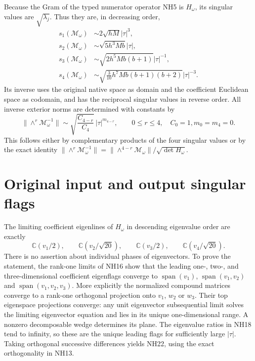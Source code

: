 \documentclass[11pt]{article}
\newcommand{\C}{\mathbb C}
\begin{document}
Because the Gram of the typed numerator operator NH5 is
$H_\omega$, its singular values are $\sqrt{\lambda_j}$.
Thus they are, in decreasing order,
\[
\boxed{\begin{aligned}
 s_1(\mathcal M_\omega)&\sim2\sqrt{hM}|\tau|^3,\\
 s_2(\mathcal M_\omega)&\sim\sqrt{5h^3Mb}|\tau|,\\
 s_3(\mathcal M_\omega)&\sim\sqrt{2h^5Mb(b+1)}|\tau|^{-1},\\
 s_4(\mathcal M_\omega)&\sim\sqrt{\tfrac3{10}h^7Mb(b+1)(b+2)}|\tau|^{-3}.
\end{aligned}}\tag{NH20}
\]
Its inverse uses the original native space as domain and the
coefficient Euclidean space as codomain, and has the reciprocal
singular values in reverse order. All inverse exterior norms
are determined with constants by
\[
 \|\wedge^r\mathcal M_\omega^{-1}\|
 \sim\sqrt{\frac{C_{4-r}}{C_4}}\,
            |\tau|^{m_{4-r}},\qquad 0\le r\le4,
 \quad C_0=1, m_0=m_4=0.
 \tag{NH21}
\]
This follows either by complementary products of the four
singular values or by the exact identity
$\|\wedge^r\mathcal M_\omega^{-1}\|
=\|\wedge^{4-r}\mathcal M_\omega\|/\sqrt{\det H_\omega}$.

\section{Original input and output singular flags}
The limiting coefficient eigenlines of $H_\omega$ in descending
eigenvalue order are exactly
\[
 \C(v_1/2),\qquad\C(v_2/\sqrt{20}),\qquad
 \C(v_3/2),\qquad\C(v_4/\sqrt{20}).
 \tag{NH22}
\]
There is no assertion about individual phases of eigenvectors.
To prove the statement, the rank-one limits of NH16 show that
the leading one-, two-, and three-dimensional coefficient
eigenflags converge to
$\operatorname{span}(v_1)$, $\operatorname{span}(v_1,v_2)$ and
$\operatorname{span}(v_1,v_2,v_3)$. More explicitly the normalized compound
matrices converge to a rank-one orthogonal projection onto
$v_1$, $w_2$ or $w_3$. Their top eigenspace projections converge:
any unit eigenvector subsequential limit solves the limiting
eigenvector equation and lies in its unique one-dimensional
range. A nonzero decomposable wedge determines its plane.
The eigenvalue ratios in NH18 tend to infinity, so these are
the unique leading flags for sufficiently large $|\tau|$.
Taking orthogonal successive differences yields NH22, using
the exact orthogonality in NH13.
\end{document}
